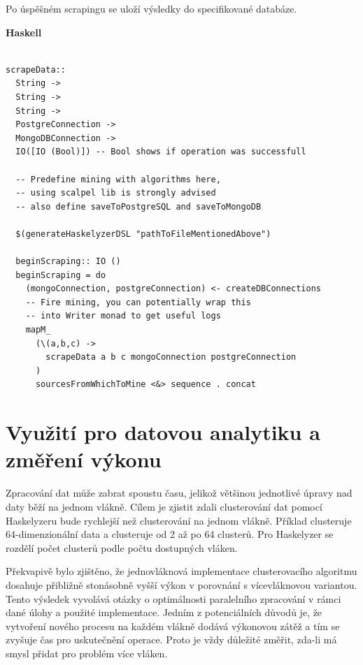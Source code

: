 \documentclass[male,czech]{kithesis}
\begin{document}
Po úspěšném scrapingu se uloží výsledky do specifikované databáze.

\textbf{Haskell}
\begin{verbatim}

scrapeData:: 
  String -> 
  String -> 
  String -> 
  PostgreConnection -> 
  MongoDBConnection -> 
  IO([IO (Bool)]) -- Bool shows if operation was successfull

  -- Predefine mining with algorithms here, 
  -- using scalpel lib is strongly advised
  -- also define saveToPostgreSQL and saveToMongoDB

  $(generateHaskelyzerDSL "pathToFileMentionedAbove")

  beginScraping:: IO ()
  beginScraping = do
    (mongoConnection, postgreConnection) <- createDBConnections
    -- Fire mining, you can potentially wrap this 
    -- into Writer monad to get useful logs
    mapM_ 
      (\(a,b,c) -> 
        scrapeData a b c mongoConnection postgreConnection
      ) 
      sourcesFromWhichToMine <&> sequence . concat
\end{verbatim}

\section{Využití pro datovou analytiku a změření výkonu}
 
Zpracování dat může zabrat spoustu času, 
jelikož většinou jednotlivé úpravy nad daty běží na jednom vlákně.
Cílem je zjistit zdali clusterování dat pomocí 
Haskelyzeru bude rychlejší než clusterování na jednom vlákně.
Příklad clusteruje 64-dimenzionální data a clusteruje 
od 2 až po 64 clusterů. 
Pro Haskelyzer se rozdělí počet clusterů podle počtu dostupných vláken.

Překvapivě bylo zjištěno, 
že jednovláknová implementace clusterovacího algoritmu 
dosahuje přibližně stonásobně vyšší výkon v porovnání s vícevláknovou variantou. 
Tento výsledek vyvolává otázky o optimálnosti paralelního zpracování v rámci dané úlohy 
a použité implementace.
Jedním z potenciálních důvodů je, 
že vytvoření nového procesu na každém vlákně dodává výkonovou zátěž
a tím se zvyšuje čas pro uskutečnění operace.
Proto je vždy důležité změřit, 
zda-li má smysl přidat pro problém více vláken.

{\centering
{}
}
\end{document}
